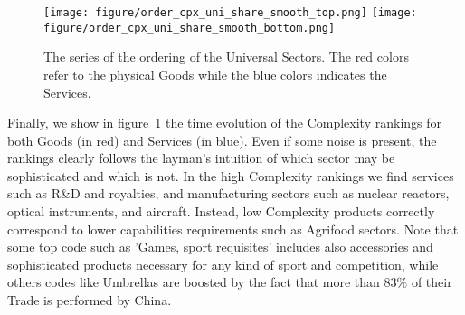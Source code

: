 \documentclass[fleqn,10pt]{article}
\begin{document}
\begin{figure}[!h]
	\centering
	\texttt{[image: figure/order\_cpx\_uni\_share\_smooth\_top.png]}
	\texttt{[image: figure/order\_cpx\_uni\_share\_smooth\_bottom.png]}
	\caption{The series of the ordering of the Universal Sectors. The red colors refer to the physical Goods while the blue colors indicates the Services.}
	\label{fig:complexity_orders}
\end{figure}
Finally, we show in figure~\ref{fig:complexity_orders} the time evolution of the Complexity rankings for both Goods (in red) and Services (in blue). 
Even if some noise is present, the rankings clearly follows the layman's intuition of which sector may be sophisticated and which is not. 
In the high Complexity rankings we find services such as R\&D and royalties, and manufacturing sectors such as nuclear reactors, optical instruments, and aircraft. 
Instead, low Complexity products correctly correspond to lower capabilities requirements such as Agrifood sectors.
Note that some top code such as 'Games, sport requisites' includes also accessories and sophisticated products necessary for any kind of sport and competition, while others codes like Umbrellas are boosted by the fact that more than $83\%$ of their Trade is performed by China.
%

\end{document}
